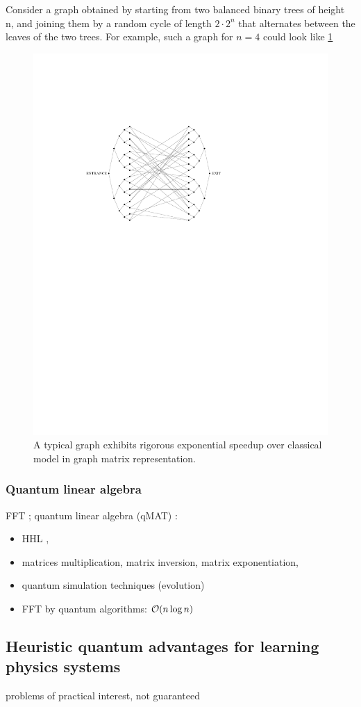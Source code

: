 Consider a graph obtained by starting from two balanced binary trees of height n, and joining them by a random cycle of length $2\cdot 2^n$ that alternates between the leaves of the two trees. 
For example, such a graph for $n = 4$ could look like \cref{fig:glued_tree}
\begin{figure}[!ht]
	\centering
	\includegraphics[width=.5\linewidth]{glued_tree.pdf}
	\caption{A typical graph exhibits rigorous exponential speedup over classical model in graph matrix representation. \cite{childsExponentialAlgorithmicSpeedup2003}}
	\label{fig:glued_tree}
\end{figure}

\subsubsection{Quantum linear algebra}
FFT \cite{kondorGraphletSpectrum2009};
quantum linear algebra (qMAT) \cite{zhaoCompilingBasicLinear2019}: 
\begin{itemize}
	\item HHL \cite{harrowQuantumAlgorithmSolving2009}, 
	\item matrices multiplication, matrix inversion, matrix exponentiation, 
	\item quantum simulation techniques (evolution)
	\item FFT by quantum algorithms: $\mathcal{O}(n\log n)$
\end{itemize}
\cite{sornsaengQuantumDiffusionMap2021}

\subsection{Heuristic quantum advantages for learning physics systems}
problems of practical interest,
not guaranteed 

